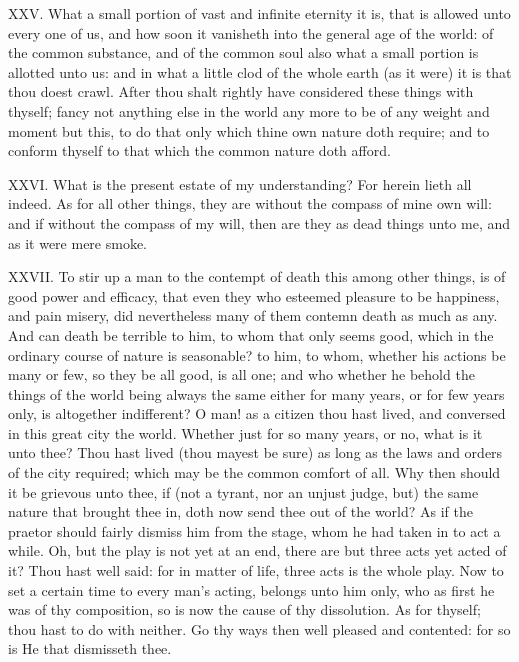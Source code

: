 XXV. What a small portion of vast and infinite eternity it is, that is
allowed unto every one of us, and how soon it vanisheth into the general
age of the world: of the common substance, and of the common soul also
what a small portion is allotted unto us: and in what a little clod of the
whole earth (as it were) it is that thou doest crawl. After thou shalt
rightly have considered these things with thyself; fancy not anything else
in the world any more to be of any weight and moment but this, to do that
only which thine own nature doth require; and to conform thyself to that
which the common nature doth afford.

XXVI. What is the present estate of my understanding? For herein lieth
all indeed. As for all other things, they are without the compass of mine
own will: and if without the compass of my will, then are they as dead
things unto me, and as it were mere smoke.

XXVII. To stir up a man to the contempt of death this among other
things, is of good power and efficacy, that even they who esteemed
pleasure to be happiness, and pain misery, did nevertheless many of them
contemn death as much as any. And can death be terrible to him, to whom
that only seems good, which in the ordinary course of nature is
seasonable? to him, to whom, whether his actions be many or few, so they
be all good, is all one; and who whether he behold the things of the world
being always the same either for many years, or for few years only, is
altogether indifferent? O man! as a citizen thou hast lived, and conversed
in this great city the world. Whether just for so many years, or no, what
is it unto thee? Thou hast lived (thou mayest be sure) as long as the laws
and orders of the city required; which may be the common comfort of all.
Why then should it be grievous unto thee, if (not a tyrant, nor an unjust
judge, but) the same nature that brought thee in, doth now send thee out
of the world? As if the praetor should fairly dismiss him from the stage,
whom he had taken in to act a while. Oh, but the play is not yet at an
end, there are but three acts yet acted of it? Thou hast well said: for in
matter of life, three acts is the whole play. Now to set a certain time to
every man's acting, belongs unto him only, who as first he was of thy
composition, so is now the cause of thy dissolution. As for thyself; thou
hast to do with neither. Go thy ways then well pleased and contented: for
so is He that dismisseth thee.


